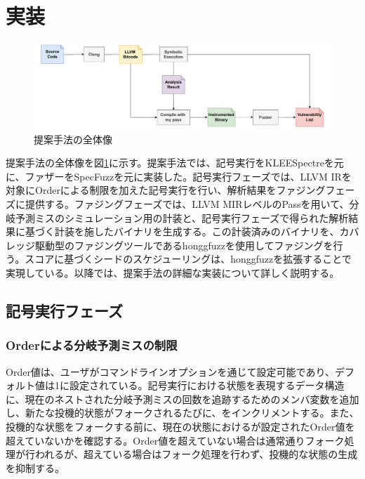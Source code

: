 \section{実装}

\begin{figure}[tb]
  \centering
  \includegraphics[width=\linewidth]{img/overall.drawio.pdf}
  \caption{提案手法の全体像}\label{fig:overall}
\end{figure}

提案手法の全体像を図\ref{fig:overall}に示す。提案手法では、記号実行をKLEESpectreを元に、ファザーをSpecFuzzを元に実装した。記号実行フェーズでは、LLVM IRを対象にOrderによる制限を加えた記号実行を行い、解析結果をファジングフェーズに提供する。ファジングフェーズでは、LLVM MIRレベルのPassを用いて、分岐予測ミスのシミュレーション用の計装と、記号実行フェーズで得られた解析結果に基づく計装を施したバイナリを生成する。この計装済みのバイナリを、カバレッジ駆動型のファジングツールであるhonggfuzz\cite{Honggfuzz}を使用してファジングを行う。スコアに基づくシードのスケジューリングは、honggfuzzを拡張することで実現している。以降では、提案手法の詳細な実装について詳しく説明する。\par

\subsection{記号実行フェーズ}
\subsubsection{Orderによる分岐予測ミスの制限}
Order値は、ユーザがコマンドラインオプションを通じて設定可能であり、デフォルト値は1に設定されている。記号実行における状態を表現するデータ構造に、現在のネストされた分岐予測ミスの回数を追跡するためのメンバ変数を追加し、新たな投機的状態がフォークされるたびに、をインクリメントする。また、投機的な状態をフォークする前に、現在の状態におけるが設定されたOrder値を超えていないかを確認する。Order値を超えていない場合は通常通りフォーク処理が行われるが、超えている場合はフォーク処理を行わず、投機的な状態の生成を抑制する。\par

